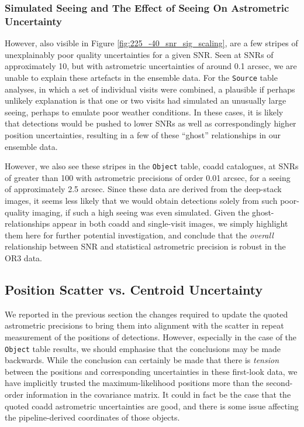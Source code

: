 \documentclass[SE,lsstdraft,authoryear,toc]{lsstdoc}
\begin{document}
\subsubsection{Simulated Seeing and The Effect of Seeing On Astrometric Uncertainty}
However, also visible in Figure \ref{fig:225_-40_snr_sig_scaling}, are a few stripes of unexplainably poor quality uncertainties for a given SNR.
Seen at SNRs of approximately 10, but with astrometric uncertainties of around 0.1 arcsec, we are unable to explain these artefacts in the ensemble data.
For the \texttt{Source} table analyses, in which a set of individual visits were combined, a plausible if perhaps unlikely explanation is that one or two visits had simulated an unusually large seeing, perhaps to emulate poor weather conditions.
In these cases, it is likely that detections would be pushed to lower SNRs as well as correspondingly higher position uncertainties, resulting in a few of these ``ghost'' relationships in our ensemble data.

However, we also see these stripes in the \texttt{Object} table, coadd catalogues, at SNRs of greater than 100 with astrometric precisions of order 0.01 arcsec, for a seeing of approximately 2.5 arcsec.
Since these data are derived from the deep-stack images, it seems less likely that we would obtain detections solely from such poor-quality imaging, if such a high seeing was even simulated.
Given the ghost-relationships appear in both coadd and single-visit images, we simply highlight them here for further potential investigation, and conclude that the \textit{overall} relationship between SNR and statistical astrometric precision is robust in the OR3 data.

\subsection{Position Scatter vs. Centroid Uncertainty}
We reported in the previous section the changes required to update the quoted astrometric precisions to bring them into alignment with the scatter in repeat measurement of the positions of detections.
However, especially in the case of the \texttt{Object} table results, we should emphasise that the conclusions may be made backwards.
While the conclusion can certainly be made that there is \textit{tension} between the positions and corresponding uncertainties in these first-look data, we have implicitly trusted the maximum-likelihood positions more than the second-order information in the covariance matrix.
It could in fact be the case that the quoted coadd astrometric uncertainties are good, and there is some issue affecting the pipeline-derived coordinates of those objects.
\end{document}
